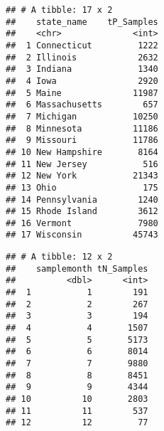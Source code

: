 \documentclass[]{article}
\newenvironment{Shaded}{\begin{snugshade}}{\end{snugshade}}
\newcommand{\DataTypeTok}[1]{\textcolor[rgb]{0.13,0.29,0.53}{#1}}
\newcommand{\KeywordTok}[1]{\textcolor[rgb]{0.13,0.29,0.53}{\textbf{#1}}}
\newcommand{\NormalTok}[1]{#1}
\newcommand{\OperatorTok}[1]{\textcolor[rgb]{0.81,0.36,0.00}{\textbf{#1}}}
\newcommand{\StringTok}[1]{\textcolor[rgb]{0.31,0.60,0.02}{#1}}
\begin{document}
\begin{Shaded}
\end{Shaded}

\begin{verbatim}
## # A tibble: 17 x 2
##    state_name    tP_Samples
##    <chr>              <int>
##  1 Connecticut         1222
##  2 Illinois            2632
##  3 Indiana             1340
##  4 Iowa                2920
##  5 Maine              11987
##  6 Massachusetts        657
##  7 Michigan           10250
##  8 Minnesota          11186
##  9 Missouri           11786
## 10 New Hampshire       8164
## 11 New Jersey           516
## 12 New York           21343
## 13 Ohio                 175
## 14 Pennsylvania        1240
## 15 Rhode Island        3612
## 16 Vermont             7980
## 17 Wisconsin          45743
\end{verbatim}

\begin{Shaded}
\end{Shaded}

\begin{verbatim}
## # A tibble: 12 x 2
##    samplemonth tN_Samples
##          <dbl>      <int>
##  1           1        191
##  2           2        267
##  3           3        194
##  4           4       1507
##  5           5       5173
##  6           6       8014
##  7           7       9880
##  8           8       8451
##  9           9       4344
## 10          10       2803
## 11          11        537
## 12          12         77
\end{verbatim}

\begin{Shaded}
\end{Shaded}
\end{document}

